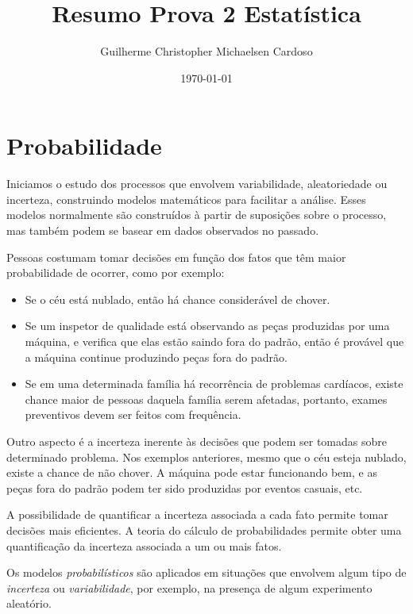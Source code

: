 \documentclass[10pt]{article}
\title{Resumo Prova 2 Estatística}
\author{Guilherme Christopher Michaelsen Cardoso}
\date{\today}
\begin{document}
\maketitle
{}
\section{Probabilidade}
\par Iniciamos o estudo dos processos que envolvem variabilidade, aleatoriedade ou incerteza, 
construindo modelos matemáticos para facilitar a análise. Esses modelos normalmente 
são construídos à partir de suposições sobre o processo, mas também podem se basear
em dados observados no passado.

\par Pessoas costumam tomar decisões em função dos fatos que têm maior probabilidade de ocorrer, como
por exemplo:

\begin{itemize}
    \item Se o céu está nublado, então há chance considerável de chover.
    \item Se um inspetor de qualidade está observando as peças produzidas por uma máquina, e 
        verifica que elas estão saindo fora do padrão, então é provável que a máquina continue
        produzindo peças fora do padrão.
    \item Se em uma determinada família há recorrência de problemas cardíacos, existe chance
        maior de pessoas daquela família serem afetadas, portanto, exames preventivos devem
        ser feitos com frequência.
\end{itemize}

\par Outro aspecto é a incerteza inerente às decisões que podem ser tomadas sobre determinado problema.
Nos exemplos anteriores, mesmo que o céu esteja nublado, existe a chance de não chover. A máquina pode
estar funcionando bem, e as peças fora do padrão podem ter sido produzidas por eventos casuais, etc.

\par A possibilidade de quantificar a incerteza associada a cada fato permite tomar decisões mais
eficientes. A teoria do cálculo de probabilidades permite obter uma quantificação da incerteza associada
a um ou mais fatos. 

\par Os modelos \textit{probabilísticos} são aplicados em situações que envolvem algum tipo de
\textit{incerteza} ou \textit{variabilidade}, por exemplo, na presença de algum experimento aleatório.
\end{document}
